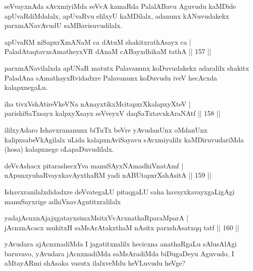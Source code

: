 \begin{artha}
seVvayxnAda sAvxmiyiMda seVvA kamaRda PalalABavu Aguvudu kaMDide \break apUvaRdiMdalalx, apUvaRvu elilxyU kaMDilalx, adanunx kANuvudakekx parxmANa\-vAvudU saMBavisuvudilalx.
\end{artha}

\begin{shl}
apUvaRM niSapxrXmANaM ca dAtuM shakitxrathAsayx ca |\\
PaladAtaqtavxsAmatheyxVR dAnaM cABayxdhikaM tathA \hfill || 157 ||
\end{shl}

\begin{artha}%
parxmANavilalxda apUNaR matutx Palavanunx koDuvudakekx adaralilx shakitx PaladAna sAmathayxRvidadxre Palavanunx koDuvudu iveV hecAcxda kalapxnegaLu.
\end{artha}

\begin{shl}
iha tivxVshAtireVkeVNa nAnayxtikxMcitapxrXkalapxyXteV |\\
parishiSaTxsayx kalpxyXsayx seVveyxV daqSaTxtavxkAraNAtf \hfill || 158 ||
\end{shl}

\begin{artha}
ililxyAdaro Ishavxrananunx biTuTx beVre yAvudanUnx oMdanUnx kalipxsa\-beVkAgilalx uLida kalapxnAviSayavu sAvxmiyalilx kaMDiruvudariMda (hosa) kalapxnege oLapaDuvudilalx.
\end{artha}

\begin{shl}
deVvAshacx pitarashecxYva manuSAyxNAmadhiVnatAmf |\\
nA\s \s punxyuhaRvayxkavAyxthaRM yadi nABUtapxrXshAsitA \hfill || 159 ||
\end{shl}

\begin{artha}
Ishavxranilalxdidadxre deVvategaLU pitaqgaLU saha havayxkavayxgaLigAgi manuSayxrige adhiVnavAgutitxralilalx
\end{artha}

\begin{shl}
yadajAcnxnAjajxgatayxsimxMsitxVvArxnathaRparaMparA |\\
jAcnxnAcacx mukitxH saMsArAtakxthaM nAsitx parxshAsatxqq tatf \hfill || 160 ||
\end{shl}

\begin{artha}
yAvudara ajAcnxnadiMda I jagatitxnalilx hecicxna anathaRgaLu sAlusAlAgi baruvavo, yAvudara jAcnxnadiMda saMsAradiMda biDugaDeyu Aguvudo, I aMtayARmi shAsaka vasutx ilalxveMdu heVLuvudu heVge?
\end{artha}

